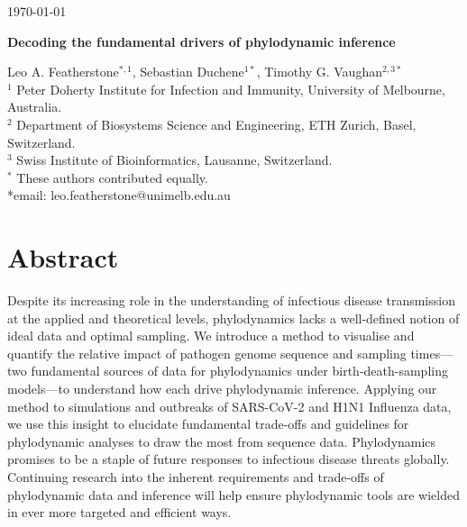 \documentclass{article}
\begin{document}
\begin{flushright}
\today
\end{flushright}
\begin{center}
\begin{LARGE}
    \textbf{Decoding the fundamental drivers of phylodynamic inference}
\end{LARGE}
\end{center}
Leo A. Featherstone$^{\ast,1}$, Sebastian Duchene$^{1*}$, Timothy G. Vaughan$^{2,3*}$\\
$^{1}$ Peter Doherty Institute for Infection and Immunity, University of Melbourne, Australia.\\
$^{2}$ Department of Biosystems Science and Engineering, ETH Zurich, Basel, Switzerland.\\
$^{3}$ Swiss Institute of Bioinformatics, Lausanne, Switzerland.\\
$^{*}$ These authors contributed equally.\\
*email: leo.featherstone@unimelb.edu.au

\section*{Abstract}Despite its increasing role in the understanding of infectious disease transmission at the applied and theoretical levels, phylodynamics lacks a well-defined notion of ideal data and optimal sampling. We introduce a method to visualise and quantify the relative impact of pathogen genome sequence and sampling times---two fundamental sources of data for phylodynamics under birth-death-sampling models---to understand how each drive phylodynamic inference. Applying our method to simulations and outbreaks of SARS-CoV-2 and H1N1 Influenza data, we use this insight to elucidate fundamental trade-offs and guidelines for phylodynamic analyses to draw the most from sequence data. Phylodynamics promises to be a staple of future responses to infectious disease threats globally. Continuing research into the inherent requirements and trade-offs of phylodynamic data and inference will help ensure phylodynamic tools are wielded in ever more targeted and efficient ways.
\end{document}
